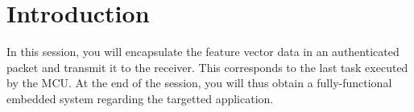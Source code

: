 \section*{Introduction}

In this session, you will encapsulate the feature vector data in an authenticated packet and transmit it to the receiver. This corresponds to the last task executed by the MCU. At the end of the session, you will thus obtain a fully-functional embedded system regarding the targetted application.
